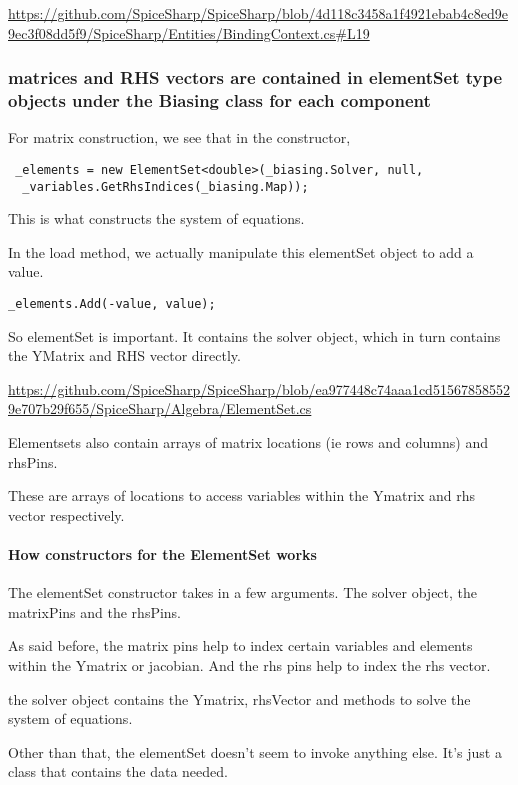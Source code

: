 \documentclass[12pt]{article}
\renewcommand{\_}{\kern-1.5pt\textunderscore\kern-1.5pt}
\begin{document}
\url{https://github.com/SpiceSharp/SpiceSharp/blob/4d118c3458a1f4921ebab4c8ed9e9ec3f08dd5f9/SpiceSharp/Entities/BindingContext.cs#L19}

\subsubsection{matrices and RHS vectors are contained in elementSet type objects under the Biasing class for each component}

For matrix construction, we see that in the constructor,

\begin{verbatim}
 _elements = new ElementSet<double>(_biasing.Solver, null,
  _variables.GetRhsIndices(_biasing.Map));
\end{verbatim}

This is what constructs the system of equations.

In the load method, we actually manipulate this elementSet object to add a value.

\begin{verbatim}
_elements.Add(-value, value);
\end{verbatim}

So elementSet is important. It contains the solver object, which in turn contains the YMatrix and RHS vector directly.

\url{https://github.com/SpiceSharp/SpiceSharp/blob/ea977448c74aaa1cd515678585529e707b29f655/SpiceSharp/Algebra/ElementSet.cs}

Elementsets also contain arrays of matrix locations (ie rows and columns) and rhsPins.

These are arrays of locations to access variables within the Ymatrix and rhs vector respectively.

\paragraph{How constructors for the ElementSet works}

The elementSet constructor takes in a few arguments. The solver object, the matrixPins and the rhsPins.

As said before, the matrix pins help to index certain variables and elements within the Ymatrix or jacobian. And the rhs pins help to index the rhs vector.

the solver object contains the Ymatrix, rhsVector and methods to solve the system of equations. 

Other than that, the elementSet doesn't seem to invoke anything else. It's just a class that contains the data needed. 
\end{document}
